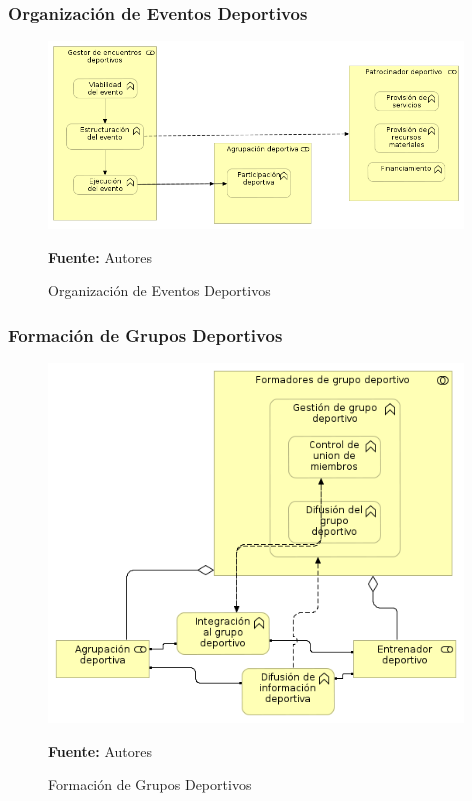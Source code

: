 \subsubsection{Organización de Eventos Deportivos}

\begin{figure}[!htb]
  \begin{center}
    \includegraphics[width=11cm]{./imagenes/business_functions/organizacioneventosdeportivos.png}
    \caption{Organización de Eventos Deportivos}
    \label{fig:organizacion_eventos_deportivos}
    \textbf{Fuente:}  Autores
  \end{center}
\end{figure}

\subsubsection{Formación de Grupos Deportivos}

\begin{figure}[!htb]
  \begin{center}
    \includegraphics[width=11cm]{./imagenes/business_functions/formaciongruposdeportivos.png}
    \caption{Formación de Grupos Deportivos}
    \label{fig:formacion_grupos_deportivos}
    \textbf{Fuente:}  Autores
  \end{center}
\end{figure}

